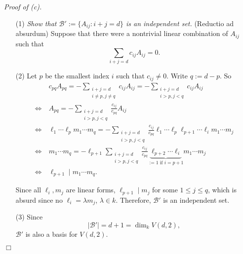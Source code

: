 \documentclass{article}
\begin{document}
\emph{Proof of (c).}
\begin{enumerate}
\item[(1)]
  \emph{Show that $\mathscr{B}' := \{ A_{ij} : i+j=d \}$ is an independent set.}
  (Reductio ad absurdum)
  Suppose that there were a nontrivial linear combination of $A_{ij}$ such that
  \[
    \sum_{i+j=d} c_{ij} A_{ij} = 0.
  \]

\item[(2)]
  Let $p$ be the smallest index $i$ such that $c_{ij} \neq 0$.
  Write $q := d - p$.
  So
  \begin{align*}
    & \: c_{pq} A_{pq}
    = -\sum_{\substack{i+j=d \\ i \neq p, j \neq q}} c_{ij} A_{ij}
    = -\sum_{\substack{i+j=d \\ i > p, j < q}} c_{ij} A_{ij} \\
    \Longleftrightarrow& \:
    A_{pq} = -\sum_{\substack{i+j=d \\ i > p, j < q}} \frac{c_{ij}}{c_{pq}} A_{ij} \\
    \Longleftrightarrow& \:
    \ell_1 \cdots \ell_p m_1 \cdots m_q
      = -\sum_{\substack{i+j=d \\ i > p, j < q}} \frac{c_{ij}}{c_{pq}}
        \ell_1 \cdots \ell_p \ell_{p+1} \cdots \ell_i m_1 \cdots m_j \\
    \Longleftrightarrow& \:
    m_1 \cdots m_q
      = - \ell_{p+1} \sum_{\substack{i+j=d \\ i > p, j < q}} \frac{c_{ij}}{c_{pq}}
        \underbrace{\ell_{p+2} \cdots \ell_i}_{:= 1 \text{ if } i = p+1} m_1 \cdots m_j \\
    \Longleftrightarrow& \:
    \ell_{p+1} \mid m_1 \cdots m_q.
  \end{align*}

  Since all $\ell_i, m_j$ are linear forms,
  $\ell_{p+1} \mid m_j$ for some $1 \leq j \leq q$,
  which is absurd since no $\ell_i = \lambda m_j$, $\lambda \in k$.
  Therefore, $\mathscr{B}'$ is an independent set.

\item[(3)]
  Since
  \[
    |\mathscr{B}'| = d+1 = \dim_{k} V(d,2),
  \]
  $\mathscr{B}'$ is also a basis for $V(d,2)$.
\end{enumerate}
$\Box$ \\\\



\end{document}
